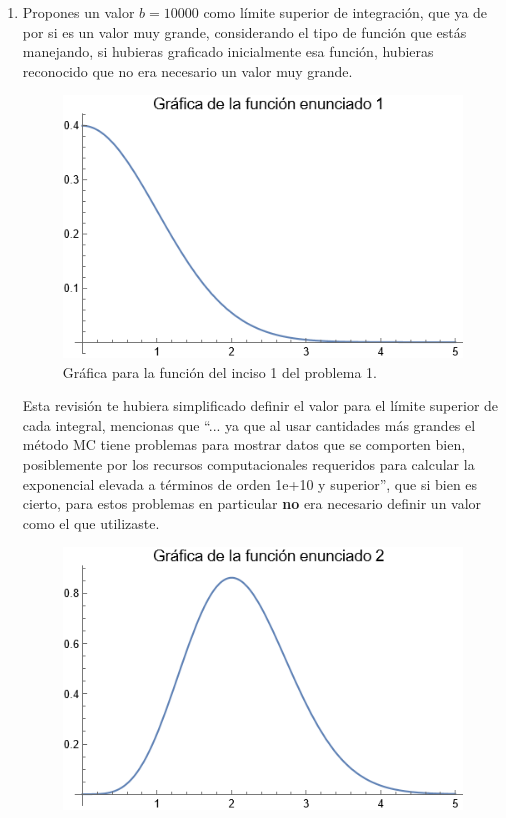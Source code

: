 \begin{enumerate}
\begin{figure}[H]
\end{figure}
\item Propones un valor $b = 10000$ como límite superior de integración, que ya de por si es un valor muy grande, considerando el tipo de función que estás manejando, si hubieras graficado inicialmente esa función, hubieras reconocido que no era necesario un valor muy grande.
\begin{figure}[H]
    \centering
    \includegraphics[scale=0.7]{plot_P1_Inciso_01.png}
    \caption{Gráfica para la función del inciso 1 del problema 1.}
\end{figure}
Esta revisión te hubiera simplificado definir el valor para el límite superior de cada integral, mencionas que \enquote{... ya que al usar cantidades más grandes el método MC tiene problemas para mostrar datos que se comporten bien, posiblemente por los recursos computacionales requeridos para calcular la exponencial elevada a términos de orden 1e+10 y superior}, que si bien es cierto, para estos problemas en particular \textbf{no} era necesario definir un valor como el que utilizaste.
\begin{figure}[H]
    \centering
    \includegraphics[scale=0.7]{plot_P1_Inciso_02.png}

\end{figure}
\end{enumerate}
